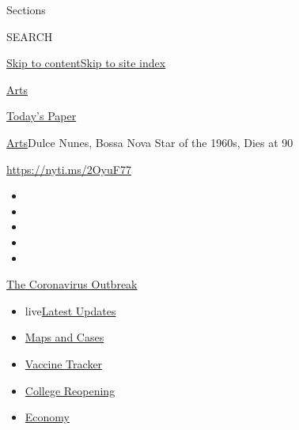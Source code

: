 Sections

SEARCH

\protect\hyperlink{site-content}{Skip to
content}\protect\hyperlink{site-index}{Skip to site index}

\href{https://www.nytimes.com/section/arts}{Arts}

\href{https://myaccount.nytimes.com/auth/login?response_type=cookie\&client_id=vi}{}

\href{https://www.nytimes.com/section/todayspaper}{Today's Paper}

\href{/section/arts}{Arts}\textbar{}Dulce Nunes, Bossa Nova Star of the
1960s, Dies at 90

\url{https://nyti.ms/2OyuF77}

\begin{itemize}
\item
\item
\item
\item
\item
\end{itemize}

\href{https://www.nytimes.com/news-event/coronavirus?action=click\&pgtype=Article\&state=default\&region=TOP_BANNER\&context=storylines_menu}{The
Coronavirus Outbreak}

\begin{itemize}
\tightlist
\item
  live\href{https://www.nytimes.com/2020/08/03/world/coronavirus-covid-19.html?action=click\&pgtype=Article\&state=default\&region=TOP_BANNER\&context=storylines_menu}{Latest
  Updates}
\item
  \href{https://www.nytimes.com/interactive/2020/us/coronavirus-us-cases.html?action=click\&pgtype=Article\&state=default\&region=TOP_BANNER\&context=storylines_menu}{Maps
  and Cases}
\item
  \href{https://www.nytimes.com/interactive/2020/science/coronavirus-vaccine-tracker.html?action=click\&pgtype=Article\&state=default\&region=TOP_BANNER\&context=storylines_menu}{Vaccine
  Tracker}
\item
  \href{https://www.nytimes.com/2020/08/02/us/covid-college-reopening.html?action=click\&pgtype=Article\&state=default\&region=TOP_BANNER\&context=storylines_menu}{College
  Reopening}
\item
  \href{https://www.nytimes.com/live/2020/08/03/business/stock-market-today-coronavirus?action=click\&pgtype=Article\&state=default\&region=TOP_BANNER\&context=storylines_menu}{Economy}
\end{itemize}

